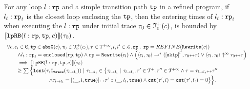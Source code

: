 
\begin{lemma}
  \label{lemma:looprb-sound}
  For any loop $l: \mathtt{rp}$ and a simple transition path $\mathtt{tp}$ in a refined program, if $l_t: \mathtt{rp}_t$ is the closest loop enclosing the $\mathtt{tp}$, then the entering times of $l_t: \mathtt{rp}_t$ when executing the $l: \mathtt{rp}$ under initial trace $\mathtt{\tau}_0 \in \mathcal{T}^{+}_0(c)$, is bounded by $\llbracket \mathtt{lpRB}(l: \mathtt{rp}, \mathtt{tp}, c) \rrbracket(\mathtt{\tau}_0)$.
  \[
    \begin{array}{l}
    \forall c, c_l \in \cdom, \tpath \in \absG(c), \trace_0 \in \ftdom_0(c_l), \trace \in \tdom, l, l' \in \ldom, \rprog \st 
    \rprog = REFINE(\algrewrite(c))
    \\ \qquad
    \land l_t: \rprog_t = \kw{enclosed}(\rprog, \tpath)
    \land 
    \rprog = \algrewrite(c_l)
    \land
    \Big(
    \config{c_l, \trace_0} \to^* \config{\clabel{\eskip}^{l'}, \trace_0 \tracecat \trace}
    \lor \config{c_l, \trace_0} \uparrow^{\infty} \trace_0 \tracecat \trace 
    \Big)
    \\ \qquad
    \implies
    \econfig{\lpchB(l: \rprog, \tpath, c)}(\trace_0) 
    \\ \qquad \geq 
      \sum\Big\{
      \lcounter(\trace, \tracel(\trace_{l \to l_t})) ~\vert~ \trace_{l \to l_t} \in 
      \big\{\trace_{l \to l_t} ~\vert~ 
      \trace_{l \to l_t}, \trace' \in \ftdom, \trace'' \in \tdom
      \land \trace = \trace_{l \to l_t} \tracecat \trace''
      \\ \qquad \qquad \qquad \qquad
      \land \trace_{l \to l_t} = [(\_, l, \etrue)] \tracecat \trace' :: (\_, l_t, \etrue)
      \land \counter(\trace', l) = \counter(\trace', l_t) = 0 
      \big\}
      \Big\}.
\end{array}
  \]
  \end{lemma}
